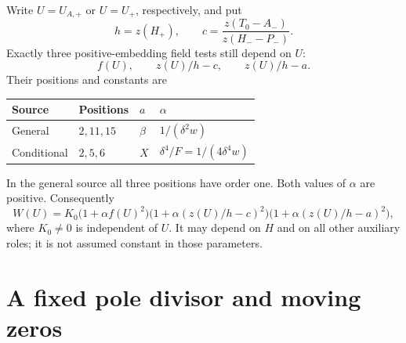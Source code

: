 \documentclass[11pt,a4paper]{article}
\theoremstyle{remark}\newtheorem{remark}[theorem]{Remark}
\begin{document}
Write $U=U_{A,+}$ or $U=U_+$, respectively, and put
\[
 h=z(H_+),\qquad
 c=\frac{z(T_0-A_-)}{z(H_--P_-)}.
\]
Exactly three positive-embedding field tests still depend on $U$:
\[
                 f(U),\qquad z(U)/h-c,\qquad z(U)/h-a.
\]
Their positions and constants are
\begin{center}
\begin{tabular}{llll}\toprule
Source & Positions & $a$ & $\alpha$\\\midrule
General & $2,11,15$ & $\beta$ & $1/(\delta^2w)$\\
Conditional & $2,5,6$ & $X$ & $\delta^4/F=1/(4\delta^4w)$\\\bottomrule
\end{tabular}
\end{center}
In the general source all three positions have order one.
Both values of $\alpha$ are positive. Consequently
\begin{equation}\label{eq:Wboundary}
 W(U)=K_0\bigl(1+\alpha f(U)^2\bigr)
       \bigl(1+\alpha(z(U)/h-c)^2\bigr)
       \bigl(1+\alpha(z(U)/h-a)^2\bigr),
\end{equation}
where $K_0\ne0$ is independent of $U$. It may depend on $H$
and on all other auxiliary roles; it is not assumed constant in
those parameters.

\section{A fixed pole divisor and moving zeros}
\end{document}
